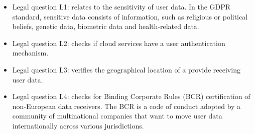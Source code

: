 \documentclass[11pt,english]{article}
\begin{document}
\begin{itemize}
    \item Legal question L1: relates to the sensitivity of user data. In the GDPR standard, sensitive data consists of information, such as religious or political beliefs, genetic data, biometric data and health-related data.
    \item Legal question L2: checks if cloud services have a user authentication mechanism.
    \item Legal question L3: veriﬁes the geographical location of a provide receiving user data.
    \item Legal question L4: checks for Binding Corporate Rules
(BCR) certiﬁcation of non-European data receivers. The BCR is a code of conduct adopted by a community of multinational companies that want to move user data internationally across various jurisdictions.
\end{itemize}
\end{document}
